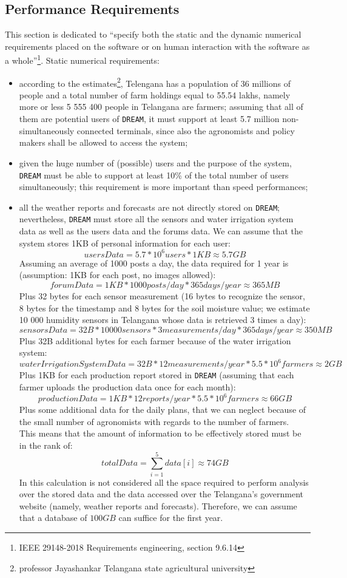 \documentclass{article}
\begin{document}
\newpage
\raggedright
\subsection{Performance Requirements}
This section is dedicated to “specify both the static and the dynamic numerical requirements placed on the software or on human interaction with the software as a whole”\footnote{IEEE 29148-2018 Requirements engineering, section 9.6.14}.
Static numerical requirements:
\begin{itemize}
\item according to the estimates\footnote{professor Jayashankar Telangana state agricultural university}, Telengana has a population of 36 millions of people and a total number of farm holdings equal to 55.54 lakhs, namely more or less 5 555 400 people in Telangana are farmers; assuming that all of them are potential users of \verb|DREAM|, it must support at least 5.7 million non-simultaneously connected terminals, since also the agronomists and policy makers shall be allowed to access the system;
\item given the huge number of (possible) users and the purpose of the system, \verb|DREAM| must be able to support at least 10\% of the total number of users simultaneously; this requirement is more important than speed performances;
\item all the weather reports and forecasts are not directly stored on \verb|DREAM|; nevertheless, \verb|DREAM| must store all the sensors and water irrigation system data as well as the users data and the forums data. 
We can assume that the system stores 1KB of personal information for each user:
\[ usersData = 5.7 * 10^6 users * 1 KB \approx 5.7 GB \]
Assuming an average of 1000 posts a day, the data required for 1 year is (assumption: 1KB for each post, no images allowed):
\[forumData = 1 KB * 1000 posts/day * 365 days/year \approx 365 MB \]
Plus 32 bytes for each sensor measurement (16 bytes to recognize the sensor, 8 bytes for the timestamp and 8 bytes for the soil moisture value; we estimate 10 000 humidity sensors in Telangana whose data is retrieved 3 times a day):
\[sensorsData = 32 B * 10 000 sensors * 3 measurements/day * 365 days/year \approx 350 MB \]
Plus 32B additional bytes for each farmer because of the water irrigation system:
\[waterIrrigationSystemData = 32 B * 12 measurements/year * 5.5 * 10^6 farmers \approx 2 GB \]
Plus 1KB for each production report stored in \verb|DREAM| (assuming that each farmer uploads the production data once for each month):
\[productionData = 1 KB * 12 reports/year * 5.5 * 10^6 farmers \approx 66 GB \]
Plus some additional data for the daily plans, that we can neglect because of the small number of agronomists with regards to the number of farmers.\\
This means that the amount of information to be effectively stored must be in the rank of:
\[totalData = \sum_{i=1}^{5} data[i] \approx 74 GB \]
In this calculation is not considered all the space required to perform analysis over the stored data and the data accessed over the Telangana's government website (namely, weather reports and forecasts). Therefore, we can assume that a database of $100 GB$ can suffice for the first year.
\end{itemize}
\end{document}

